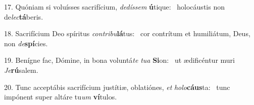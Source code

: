 17. Quóniam si voluísses sacrifícium, \textit{de}\textit{dís}\textit{sem} \textbf{ú}tique: \ast\  holocáustis non de\textit{lec}\textbf{tá}beris.\

18. Sacrifícium Deo spíritus \textit{con}\textit{tri}\textit{bu}\textbf{lá}tus: \ast\  cor contrítum et humiliátum, Deus, non \textit{de}\textbf{spí}cies.\

19. Benígne fac, Dómine, in bona voluntá\textit{te} \textit{tu}\textit{a} \textbf{Si}on: \ast\  ut ædificéntur muri \textit{Je}\textbf{rú}salem.\

20. Tunc acceptábis sacrifícium justítiæ, oblatiónes, \textit{et} \textit{ho}\textit{lo}\textbf{cáus}ta: \ast\  tunc impónent super altáre tu\textit{um} \textbf{ví}tulos.\

